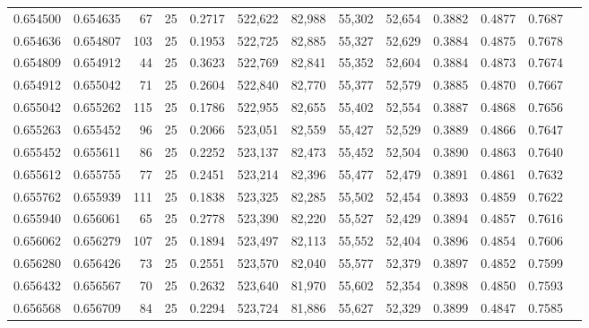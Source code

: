 \begin{tabular}{rrrrrrrrrrrrr}
0.654500 & 0.654635 &    67 &  25 &                                     0.2717 & 522,622 &  82,988 &  55,302 &  52,654 & 0.3882 & 0.4877 & 0.7687 \\
0.654636 & 0.654807 &   103 &  25 &                                     0.1953 & 522,725 &  82,885 &  55,327 &  52,629 & 0.3884 & 0.4875 & 0.7678 \\
0.654809 & 0.654912 &    44 &  25 &                                     0.3623 & 522,769 &  82,841 &  55,352 &  52,604 & 0.3884 & 0.4873 & 0.7674 \\
0.654912 & 0.655042 &    71 &  25 &                                     0.2604 & 522,840 &  82,770 &  55,377 &  52,579 & 0.3885 & 0.4870 & 0.7667 \\
0.655042 & 0.655262 &   115 &  25 &                                     0.1786 & 522,955 &  82,655 &  55,402 &  52,554 & 0.3887 & 0.4868 & 0.7656 \\
0.655263 & 0.655452 &    96 &  25 &                                     0.2066 & 523,051 &  82,559 &  55,427 &  52,529 & 0.3889 & 0.4866 & 0.7647 \\
0.655452 & 0.655611 &    86 &  25 &                                     0.2252 & 523,137 &  82,473 &  55,452 &  52,504 & 0.3890 & 0.4863 & 0.7640 \\
0.655612 & 0.655755 &    77 &  25 &                                     0.2451 & 523,214 &  82,396 &  55,477 &  52,479 & 0.3891 & 0.4861 & 0.7632 \\
0.655762 & 0.655939 &   111 &  25 &                                     0.1838 & 523,325 &  82,285 &  55,502 &  52,454 & 0.3893 & 0.4859 & 0.7622 \\
0.655940 & 0.656061 &    65 &  25 &                                     0.2778 & 523,390 &  82,220 &  55,527 &  52,429 & 0.3894 & 0.4857 & 0.7616 \\
0.656062 & 0.656279 &   107 &  25 &                                     0.1894 & 523,497 &  82,113 &  55,552 &  52,404 & 0.3896 & 0.4854 & 0.7606 \\
0.656280 & 0.656426 &    73 &  25 &                                     0.2551 & 523,570 &  82,040 &  55,577 &  52,379 & 0.3897 & 0.4852 & 0.7599 \\
0.656432 & 0.656567 &    70 &  25 &                                     0.2632 & 523,640 &  81,970 &  55,602 &  52,354 & 0.3898 & 0.4850 & 0.7593 \\
0.656568 & 0.656709 &    84 &  25 &                                     0.2294 & 523,724 &  81,886 &  55,627 &  52,329 & 0.3899 & 0.4847 & 0.7585 \\

\end{tabular}
